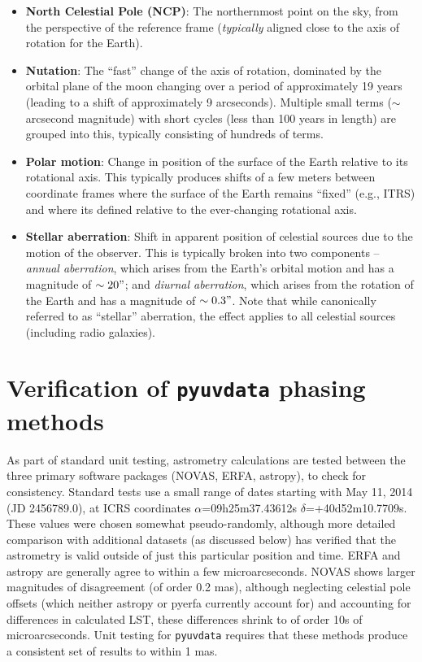 \documentclass[11pt, oneside]{article}
\begin{document}
\begin{itemize}
    \item\textbf{North Celestial Pole (NCP)}: The northernmost point on the sky, from the perspective of the reference frame (\emph{typically} aligned close to the axis of rotation for the Earth).
    \item\textbf{Nutation}: The ``fast'' change of the axis of rotation, dominated by the orbital plane of the moon changing over a period of approximately 19 years (leading to a shift of approximately 9 arcseconds). Multiple small terms ($\sim$ arcsecond magnitude) with short cycles (less than 100 years in length) are grouped into this, typically consisting of hundreds of terms.
    \item\textbf{Polar motion}: Change in position of the surface of the Earth relative to its rotational axis. This typically produces shifts of a few meters between coordinate frames where the surface of the Earth remains ``fixed'' (e.g., ITRS) and where its defined relative to the ever-changing rotational axis.
    \item\textbf{Stellar aberration}: Shift in apparent position of celestial sources due to the motion of the observer. This is typically broken into two components -- \emph{annual aberration}, which arises from the Earth's orbital motion and has a magnitude of $\sim20"$; and \emph{diurnal aberration}, which arises from the rotation of the Earth and has a magnitude of $\sim0.3"$. Note that while canonically referred to as ``stellar'' aberration, the effect applies to all celestial sources (including radio galaxies). 
\end{itemize}

\section{Verification of \texttt{pyuvdata} phasing methods}\label{appx:verify}
As part of standard unit testing, astrometry calculations are tested between the three primary software packages (NOVAS, ERFA, astropy), to check for consistency. Standard tests use a small range of dates starting with May 11, 2014 (JD 2456789.0), at ICRS coordinates $\alpha$=09h25m37.43612s $\delta$=+40d52m10.7709s. These values were chosen somewhat pseudo-randomly, although more detailed comparison with additional datasets (as discussed below) has verified that the astrometry is valid outside of just this particular position and time. ERFA and astropy are generally agree to within a few microarcseconds. NOVAS shows larger magnitudes of disagreement (of order 0.2 mas), although neglecting celestial pole offsets (which neither astropy or pyerfa currently account for) and accounting for differences in calculated LST, these differences shrink to of order 10s of microarcseconds. Unit testing for \texttt{pyuvdata} requires that these methods produce a consistent set of results to within 1 mas.
\end{document}
